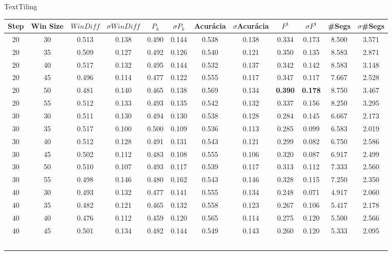 \tiny
\center TextTiling
\begin{longtable}[c]{|c|c|c|c|c|c|c|c|c|c|c|c|} 
\hline 
 Step & Win Size & $WinDiff$ & $\sigma$$WinDiff$ & $P_k$ & $\sigma$$P_k$ & Acurácia & $\sigma$Acurácia & $F^1$ & $\sigma$$F^1$ & \#Segs & $\sigma$\#Segs\\ \hline 
 20 & 30 & 0.513 & 0.138 & 0.490 & 0.144 & 0.538 & 0.138 & 0.334 & 0.173 & 8.500 & 3.571  \\ \hline 
  20 & 35 & 0.509 & 0.127 & 0.492 & 0.126 & 0.540 & 0.121 & 0.350 & 0.135 & 8.583 & 2.871  \\ \hline 
  20 & 40 & 0.517 & 0.132 & 0.495 & 0.144 & 0.532 & 0.137 & 0.342 & 0.142 & 8.583 & 3.148  \\ \hline 
  20 & 45 & 0.496 & 0.114 & 0.477 & 0.122 & 0.555 & 0.117 & 0.347 & 0.117 & 7.667 & 2.528  \\ \hline 
  20 & 50 & 0.481 & 0.140 & 0.465 & 0.138 & 0.569 & 0.134 & \cellcolor{gray!20} \textbf{0.390} & \cellcolor{gray!20} \textbf{0.178} & 8.750 & 3.467  \\ \hline 
  20 & 55 & 0.512 & 0.133 & 0.493 & 0.135 & 0.542 & 0.132 & 0.337 & 0.156 & 8.250 & 3.295  \\ \hline 
  30 & 30 & 0.511 & 0.130 & 0.494 & 0.130 & 0.538 & 0.128 & 0.284 & 0.145 & 6.667 & 2.173  \\ \hline 
  30 & 35 & 0.517 & 0.100 & 0.500 & 0.109 & 0.536 & 0.113 & 0.285 & 0.099 & 6.583 & 2.019  \\ \hline 
  30 & 40 & 0.512 & 0.128 & 0.491 & 0.131 & 0.543 & 0.121 & 0.299 & 0.082 & 6.750 & 2.586  \\ \hline 
  30 & 45 & 0.502 & 0.112 & 0.483 & 0.108 & 0.555 & 0.106 & 0.320 & 0.087 & 6.917 & 2.499  \\ \hline 
  30 & 50 & 0.510 & 0.107 & 0.493 & 0.117 & 0.539 & 0.117 & 0.313 & 0.112 & 7.333 & 2.560  \\ \hline 
  30 & 55 & 0.498 & 0.146 & 0.480 & 0.162 & 0.543 & 0.146 & 0.328 & 0.115 & 7.250 & 2.350  \\ \hline 
  40 & 30 & 0.493 & 0.132 & 0.477 & 0.141 & 0.555 & 0.134 & 0.248 & 0.071 & 4.917 & 2.060  \\ \hline 
  40 & 35 & 0.482 & 0.121 & 0.465 & 0.132 & 0.558 & 0.123 & 0.267 & 0.106 & 5.417 & 2.178  \\ \hline 
  40 & 40 & 0.476 & 0.112 & 0.459 & 0.120 & 0.565 & 0.114 & 0.275 & 0.120 & 5.500 & 2.566  \\ \hline 
  40 & 45 & 0.501 & 0.134 & 0.482 & 0.144 & 0.549 & 0.143 & 0.260 & 0.120 & 5.333 & 2.095  \\ \hline 
$$
\end{longtable}
